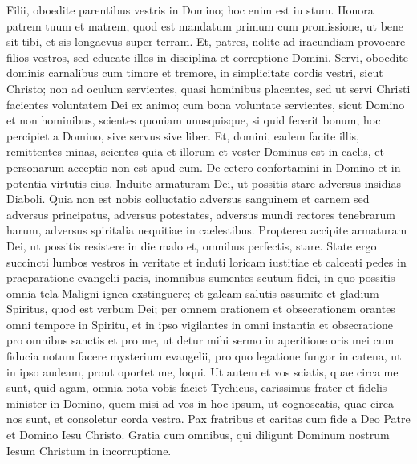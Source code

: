 \begin{biblechapter}  
\verse Filii, oboedite parentibus vestris in Domino; hoc enim est iu stum. 
\verse Honora patrem tuum et matrem, quod est mandatum primum cum promissione, 
\verse ut bene sit tibi, et sis longaevus super terram. 
\verse Et, patres, nolite ad iracundiam provocare filios vestros, sed educate illos in disciplina et correptione Domini. 
\verse Servi, oboedite dominis carnalibus cum timore et tremore, in simplicitate cordis vestri, sicut Christo; 
\verse non ad oculum servientes, quasi hominibus placentes, sed ut servi Christi facientes voluntatem Dei ex animo; 
\verse cum bona voluntate servientes, sicut Domino et non hominibus, 
\verse scientes quoniam unusquisque, si quid fecerit bonum, hoc percipiet a Domino, sive servus sive liber. 
\verse Et, domini, eadem facite illis, remittentes minas, scientes quia et illorum et vester Dominus est in caelis, et personarum acceptio non est apud eum. 
\verse De cetero confortamini in Domino et in potentia virtutis eius. 
\verse Induite armaturam Dei, ut possitis stare adversus insidias Diaboli. 
\verse Quia non est nobis colluctatio adversus sanguinem et carnem sed adversus principatus, adversus potestates, adversus mundi rectores tenebrarum harum, adversus spiritalia nequitiae in caelestibus. 
\verse Propterea accipite armaturam Dei, ut possitis resistere in die malo et, omnibus perfectis, stare. 
\verse State ergo succincti lumbos vestros in veritate et induti loricam iustitiae 
\verse et calceati pedes in praeparatione evangelii pacis, 
\verse inomnibus sumentes scutum fidei, in quo possitis omnia tela Maligni ignea exstinguere; 
\verse et galeam salutis assumite et gladium Spiritus, quod est verbum Dei; 
\verse per omnem orationem et obsecrationem orantes omni tempore in Spiritu, et in ipso vigilantes in omni instantia et obsecratione pro omnibus sanctis 
\verse et pro me, ut detur mihi sermo in aperitione oris mei cum fiducia notum facere mysterium evangelii, 
\verse pro quo legatione fungor in catena, ut in ipso audeam, prout oportet me, loqui. 
\verse Ut autem et vos sciatis, quae circa me sunt, quid agam, omnia nota vobis faciet Tychicus, carissimus frater et fidelis minister in Domino, 
\verse quem misi ad vos in hoc ipsum, ut cognoscatis, quae circa nos sunt, et consoletur corda vestra. 
\verse Pax fratribus et caritas cum fide a Deo Patre et Domino Iesu Christo. 
\verse Gratia cum omnibus, qui diligunt Dominum nostrum Iesum Christum in incorruptione.    
\end{biblechapter}

